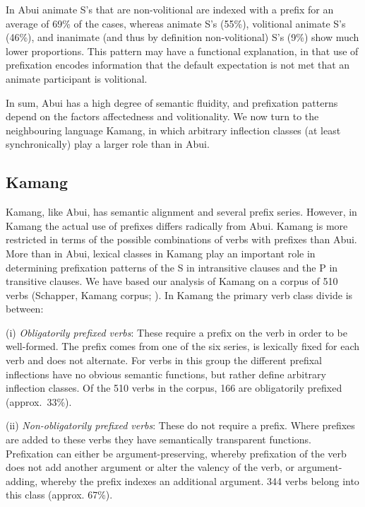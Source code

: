 In Abui animate S's that are non-volitional are indexed with a prefix for an average of 69\% of the cases, whereas animate S's (55\%), volitional animate S's (46\%), and inanimate (and thus by definition non-volitional) S's (9\%) show much lower proportions. This pattern may have a functional explanation, in that use of prefixation encodes information that the default expectation is not met that an animate participant is volitional.

In sum, Abui has a high degree of semantic fluidity, and prefixation patterns depend on the factors affectedness and volitionality. We now turn to the neighbouring language Kamang, in which arbitrary inflection classes (at least synchronically) play a larger role than in Abui.
 

\subsection{Kamang}

\label{sec:10:5.2}
Kamang, like Abui, has semantic alignment and several prefix series. However, in Kamang the actual use of prefixes differs radically from Abui. Kamang is more restricted in terms of the possible combinations of verbs with prefixes than Abui. More than in Abui, lexical classes in Kamang play an important role in determining prefixation patterns of the S in intransitive clauses and the P in transitive clauses. We have based our analysis of Kamang on a corpus of 510 verbs (Schapper, Kamang corpus; \citet{SchapperEtAl2011kamus}). In Kamang the primary verb class divide is between:
\newpage

(i)  \textit{Obligatorily prefixed verbs}: These require a prefix on the verb in order to be well-formed. The prefix comes from one of the six series, is lexically fixed for each verb and does not alternate. For verbs in this group the different prefixal inflections have no obvious semantic functions, but rather define arbitrary inflection classes. Of the 510 verbs in the corpus, 166 are obligatorily prefixed (approx.~33\%).

(ii) \textit{Non-obligatorily prefixed verbs}: These do not require a prefix. Where prefixes are added to these verbs they have semantically transparent functions. Prefixation can either be argument-preserving, whereby prefixation of the verb does not add another argument or alter the valency of the verb, or argument-adding, whereby the prefix indexes an additional argument. 344 verbs belong into this class (approx. 67\%).

